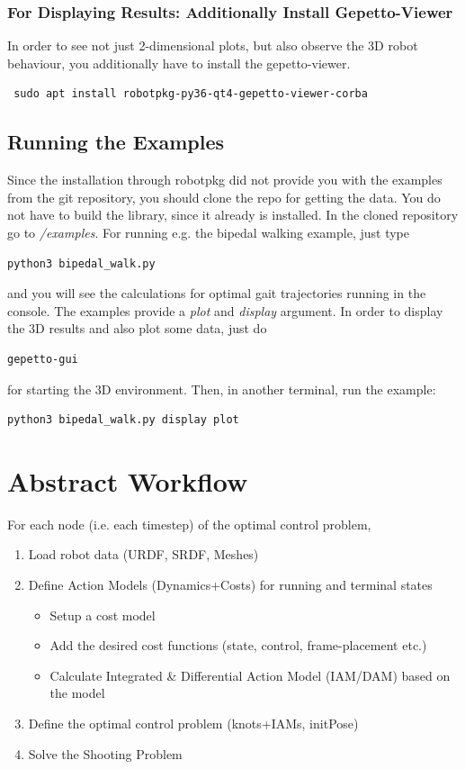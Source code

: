 \subsubsection{For Displaying Results: Additionally Install Gepetto-Viewer}
In order to see not just 2-dimensional plots, but also observe the 3D robot behaviour, you additionally have to install the gepetto-viewer.
\begin{verbatim}
 sudo apt install robotpkg-py36-qt4-gepetto-viewer-corba
\end{verbatim}

\subsection{Running the Examples}
Since the installation through robotpkg did not provide you with the examples from the git repository, you should clone the repo \cite{crocoddylweb} for getting the data. You do not have to build the library, since it already is installed. 
In the cloned repository go to \textit{/examples}. For running e.g. the bipedal walking example, just type
\begin{verbatim}
python3 bipedal_walk.py
\end{verbatim}
and you will see the calculations for optimal gait trajectories running in the console. 
The examples provide a \textit{plot} and \textit{display} argument. In order to display the 3D results and also plot some data, just do 
\begin{verbatim}
gepetto-gui
\end{verbatim}
for starting the 3D environment.
Then, in another terminal, run the example:
\begin{verbatim}
python3 bipedal_walk.py display plot
\end{verbatim}



\section{Abstract Workflow}
For each node (i.e. each timestep) of the optimal control problem, 
\begin{enumerate}
\item Load robot data (URDF, SRDF, Meshes)
\item Define Action Models (Dynamics+Costs) for running and terminal states 
	\begin{itemize}
	\item Setup a cost model
	\item Add the desired cost functions (state, control, frame-placement etc.)
	\item Calculate Integrated \& Differential Action Model (IAM/DAM) based on the model
	\end{itemize}
\item Define the optimal control problem (knots+IAMs, initPose)
\item Solve the Shooting Problem
\end{enumerate}




